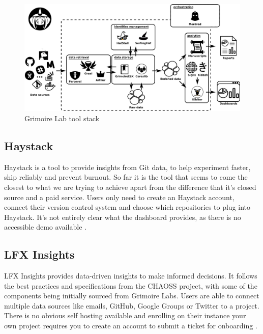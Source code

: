 \documentclass[authoryear,preprint,review,12pt]{elsarticle}
\begin{document}
\begin{figure}[h]
  \centering
  \includegraphics[width=\linewidth]{graphics/grimoirelab-all-details}
  \caption{Grimoire Lab tool stack \citep{GrimoireLab2022}}
  \label{fig:grimoire-overview}
\end{figure}

\subsection{Haystack}
\label{sec:summary:haystack}

Haystack is a tool to provide insights from Git data, to help experiment faster, ship reliably and
prevent burnout. So far it is the tool that seems to come the closest to what we are trying to
achieve apart from the difference that it's closed source and a paid service. Users only need to
create an Haystack account, connect their version control system and choose which repositories to
plug into Haystack. It's not entirely clear what the dashboard provides, as there is no accessible
demo available \citep{HaystackAnalyticsEngineering}.

\subsection{LFX Insights}
\label{sec:summary:insights}

LFX Insights provides data-driven insights to make informed decisions. It follows the best
practices and specifications from the CHAOSS project, with some of the components being initially
sourced from Grimoire Labs. Users are able to connect multiple data sources like emails, GitHub,
Google Groups or Twitter to a project. There is no obvious self hosting available and enrolling on
their instance your own project requires you to create an account to submit a ticket for onboarding
\citep{Insights}.
\end{document}
